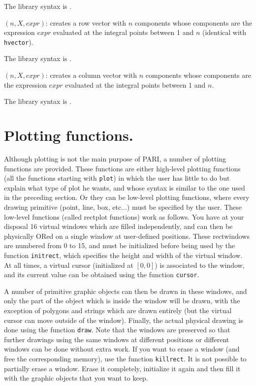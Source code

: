The library syntax is .

$(n,X,expr)$: creates a row vector with $n$ components
whose components are the expression $expr$ evaluated at the integral points
between 1 and $n$ (identical with {\tt hvector}).

The library syntax is .

$(n,X,expr)$: creates a column vector with $n$ components
whose components are the expression $expr$ evaluated at the integral points
between 1 and $n$.

The library syntax is .

\section{Plotting functions.}

Although plotting is not the main purpose of PARI, a number of plotting
functions are provided. These functions are either high-level plotting
functions (all the functions starting with {\tt plot}) in which the user
has little to do but explain what type of plot he wants, and whose syntax
is similar to the one used in the preceding section. Or they can be low-level
plotting functions, where every drawing primitive (point, line, box, etc...)
must be specified by the user. These low-level functions (called rectplot 
functions) work as follows. You have at your disposal 16 virtual windows which
are filled independently, and can then be physically ORed on a single window at
user-defined positions. These rectwindows are numbered from 0 to 15, and must
be initialized before being used by the function {\tt initrect}, which 
specifies the height and width of the virtual window. At all times, a virtual
cursor (initialized at $[0,0]$) is associated to the window, and its current
value can be obtained using the function {\tt cursor}.

A number of primitive graphic objects can then be drawn in these windows, and
only the part of the object which is inside the window will be drawn, with
the exception of polygons and strings which are drawn entirely (but the
virtual cursor can move outside of the window). Finally, the actual physical
drawing is done using the function {\tt draw}. Note that the windows are
preserved so that further drawings using the same windows at different 
positions or different windows can be done without extra work. If you want to
erase a window (and free the corresponding memory), use the function
{\tt killrect}. It is not possible to partially erase a window. Erase it
completely, initialize it again and then fill it with the graphic
objects that you want to keep.

